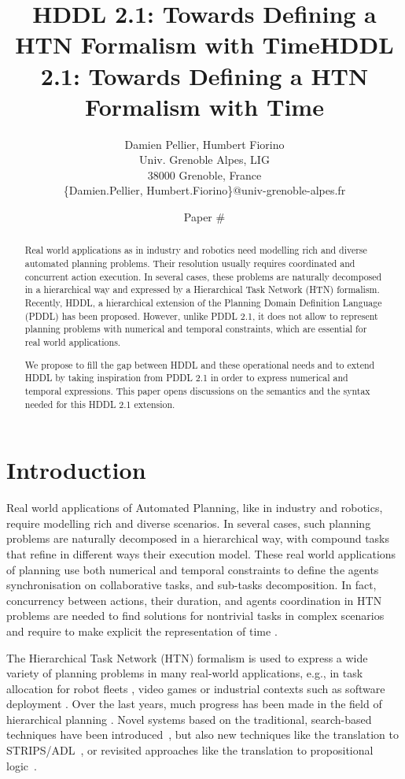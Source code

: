 \documentclass[letterpaper]{article} %
\title{HDDL 2.1: Towards Defining a HTN Formalism with Time}
\author{
Damien Pellier, Humbert Fiorino\\
Univ. Grenoble Alpes, LIG\\
38000 Grenoble, France\\
\{Damien.Pellier, Humbert.Fiorino\}@univ-grenoble-alpes.fr}
\title{HDDL 2.1: Towards Defining a HTN Formalism with Time}
\author{Paper \#}
\begin{document}
\maketitle

\begin{abstract}
Real world applications as in industry and robotics need modelling rich and diverse automated planning problems. Their resolution usually requires coordinated and concurrent action execution. In several cases, these problems are naturally decomposed in a hierarchical way and expressed by a Hierarchical Task Network (HTN) formalism. Recently, HDDL, a hierarchical extension of the Planning Domain Definition Language (PDDL) has been proposed. However, unlike PDDL 2.1, it does not allow to represent planning problems with numerical and temporal constraints, which are essential for real world applications.

We propose to fill the gap between HDDL and these operational needs and to extend HDDL by taking inspiration from  PDDL 2.1 in order to express numerical and temporal expressions. This paper opens discussions on the semantics and the syntax needed for this HDDL 2.1 extension.
\end{abstract}

\section{Introduction}

Real world applications of Automated Planning, like in industry and robotics, require modelling rich and diverse scenarios.
In several cases, such  planning problems are naturally decomposed in a hierarchical way, with compound tasks that refine in different ways their execution model.
These real world applications of planning use both numerical and temporal constraints to define the agents synchronisation on collaborative tasks, and sub-tasks decomposition. In fact, concurrency between actions, their duration, and agents coordination in HTN problems are needed to find solutions for nontrivial tasks in complex scenarios and require to make explicit the representation of time \citep{ghallabnautraverso2016}.

The Hierarchical Task Network (HTN) formalism \citep{erol94} is used to express a wide variety of planning problems in many real-world applications, e.g., in task allocation for robot fleets \citep{Milot21}, video games \citep{Menif14} or industrial contexts such as software deployment \citep{Georgievski17}. Over the last years, much progress has been made in the field of hierarchical planning \citep{bercher19}. Novel systems based on the traditional, search-based techniques have been introduced~\citep{Bit-Monnot:16,ramoul17,Shivashankar17,Bercher17,Holler19,holler20,Holler21}, but also new techniques like the translation to STRIPS/ADL~\citep{Alford09,Alford16,behnke2022}, or revisited approaches like the translation to propositional logic~\citep{behnke2018totsat,Behnke2019orderchaos,Schreiber2019SAT,Schreiber21,behnke2021}.
\end{document}
